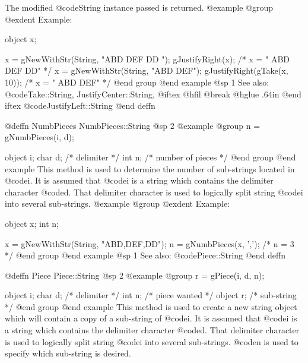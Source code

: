 The modified @code{String} instance passed is returned.
@example
@group
@exdent Example:

object  x;

x = gNewWithStr(String, "ABD  DEF  DD    ");
gJustifyRight(x);   /*  x = "    ABD  DEF  DD"    */
x = gNewWithStr(String, "ABD  DEF");
gJustifyRight(gTake(x, 10));   /*  x = "  ABD  DEF"    */
@end group
@end example
@sp 1
See also:  @code{Take::String, JustifyCenter::String,}
@iftex
@hfil @break @hglue .64in       
@end iftex
@code{JustifyLeft::String}
@end deffn













@deffn {NumbPieces} NumbPieces::String
@sp 2
@example
@group
n = gNumbPieces(i, d);

object  i;
char    d;  /*  delimiter         */
int     n;  /*  number of pieces  */
@end group
@end example
This method is used to determine the number of sub-strings located in
@code{i}.  It is assumed that @code{i} is a string which contains the
delimiter character @code{d}.  That delimiter character is used to
logically split string @code{i} into several sub-strings.
@example
@group
@exdent Example:

object  x;
int     n;

x = gNewWithStr(String, "ABD,DEF,DD");
n = gNumbPieces(x, ',');  /*  n = 3  */
@end group
@end example
@sp 1
See also:  @code{Piece::String}
@end deffn


























@deffn {Piece} Piece::String
@sp 2
@example
@group
r = gPiece(i, d, n);

object  i;
char    d;  /*  delimiter     */
int     n;  /*  piece wanted  */
object  r;  /*  sub-string    */
@end group
@end example
This method is used to create a new string object which will contain a
copy of a sub-string of @code{i}.  It is assumed that @code{i} is a
string which contains the delimiter character @code{d}.  That delimiter
character is used to logically split string @code{i} into several
sub-strings.  @code{n} is used to specify which sub-string is desired.


